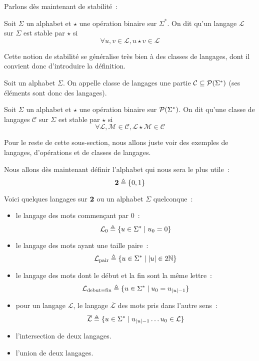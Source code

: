 Parlons dès maintenant de stabilité~:

\begin{definition}[Stabilité]
  Soit $\Sigma$ un alphabet et $\star$ une opération binaire sur $\Sigma^*$. On
  dit qu'un langage $\mathcal L$ sur $\Sigma$ est stable par $\star$ si
  \[\forall u,v\in \mathcal L, u\star v \in \mathcal L\]
\end{definition}

Cette notion de stabilité se généralise très bien à des classes de langages,
dont il convient donc d'introduire la définition.

\begin{definition}
  Soit un alphabet $\Sigma$. On appelle classe de langages une partie
  $\mathcal C\subseteq \mathcal{P}(\Sigma^*)$ (ses éléments sont donc des
  langages).
\end{definition}

\begin{definition}
  Soit $\Sigma$ un alphabet et $\star$ une opération binaire sur
  $\mathcal{P}(\Sigma^*)$. On dit qu'une classe de langages $\mathcal C$ sur
  $\Sigma$ est stable par $\star$ si
  \[\forall \mathcal L,\mathcal M\in\mathcal C,
  \mathcal L\star \mathcal M\in\mathcal C\]
\end{definition}

Pour le reste de cette sous-section, nous allons juste voir des exemples de
langages, d'opérations et de classes de langages.

\begin{example}
  Nous allons dès maintenant définir l'alphabet qui nous sera le plus utile~:
  \[\boldsymbol{2} \triangleq \{0,1\}\]

  Voici quelques langages sur $\boldsymbol{2}$ ou un alphabet $\Sigma$ quelconque~:
  \begin{itemize}
  \item le langage des mots commençant par $0$~:
    \[\mathcal L_0 \triangleq \{u\in\Sigma^*\mid u_0 = 0\}\]
  \item le langage des mots ayant une taille paire~:
    \[\mathcal L_{\mathrm{pair}} \triangleq \{u\in\Sigma^*\mid |u|\in2\mathbb N\}\]
  \item le langage des mots dont le début et la fin sont la même lettre~:
    \[\mathcal L_{\mathrm{debut}=\mathrm{fin}}\triangleq
    \{u\in\Sigma^*\mid u_0 = u_{|u| - 1}\}\]
  \item pour un langage $\mathcal L$, le langage $\overline{\mathcal L}$ des
    mots pris dans l'autre sens~:
    \[\overline{\mathcal L}\triangleq
    \{u\in\Sigma^*\mid u_{|u|-1}\ldots u_0 \in \mathcal L\}\]
  \item l'intersection de deux langages.
  \item l'union de deux langages.
  \end{itemize}
\end{example}

